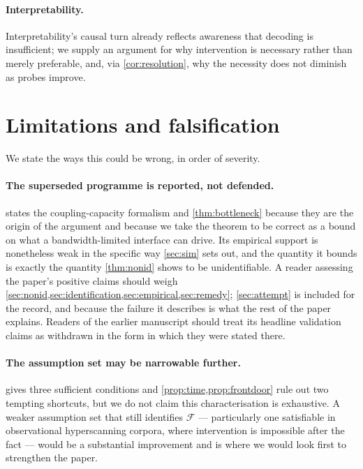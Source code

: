 \documentclass[11pt,a4paper]{article}
\theoremstyle{plain}
\theoremstyle{definition}
\theoremstyle{remark}
\newcommand{\Fc}{\mathcal{F}}
\begin{document}
\paragraph{Interpretability.}
Interpretability's causal turn \citep{geiger2021causal} already reflects awareness that decoding is
insufficient; we supply an argument for why intervention is necessary rather than merely preferable, and, via
\cref{cor:resolution}, why the necessity does not diminish as probes improve.

\section{Limitations and falsification}\label{sec:limits}

We state the ways this could be wrong, in order of severity.

\paragraph{The superseded programme is reported, not defended.}
 states the coupling-capacity formalism and \cref{thm:bottleneck} because
they are the origin of the argument and because we take the theorem to be correct as a bound on
what a bandwidth-limited interface can drive. Its empirical support is nonetheless weak in the
specific way \cref{sec:sim} sets out, and the quantity it bounds is exactly the quantity
\cref{thm:nonid} shows to be unidentifiable. A reader assessing the paper's positive claims
should weigh \cref{sec:nonid,sec:identification,sec:empirical,sec:remedy}; \cref{sec:attempt}
is included for the record, and because the failure it describes is what the rest of the paper
explains. Readers of the earlier manuscript should treat its headline validation claims as
withdrawn in the form in which they were stated there.

\paragraph{The assumption set may be narrowable further.}
 gives three sufficient conditions and \cref{prop:time,prop:frontdoor} rule out two tempting
shortcuts, but we do not claim this characterisation is exhaustive. A weaker assumption set that still
identifies $\Fc$ --- particularly one satisfiable in observational hyperscanning corpora, where intervention is
impossible after the fact --- would be a substantial improvement and is where we would look first to
strengthen the paper.
\end{document}
